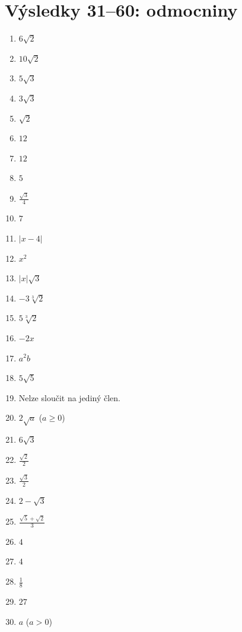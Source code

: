\documentclass[11pt,a4paper]{article}
\begin{document}
\section*{Výsledky 31--60: odmocniny}
\begin{enumerate}[label=\textbf{\arabic*.},leftmargin=9mm,itemsep=4pt,start=31]
\small
\item $6\sqrt2$
\item $10\sqrt2$
\item $5\sqrt3$
\item $3\sqrt3$
\item $\sqrt2$
\item $12$
\item $12$
\item $5$
\item $\tfrac{\sqrt3}4$
\item $7$
\item $|x-4|$
\item $x^2$
\item $|x|\sqrt3$
\item $-3\sqrt[3]2$
\item $5\sqrt[3]2$
\item $-2x$
\item $a^2b$
\item $5\sqrt5$
\item Nelze sloučit na jediný člen.
\item $2\sqrt a$ ($a\ge0$)
\item $6\sqrt3$
\item $\tfrac{\sqrt2}2$
\item $\tfrac{\sqrt3}2$
\item $2-\sqrt3$
\item $\tfrac{\sqrt5+\sqrt2}3$
\item $4$
\item $4$
\item $\tfrac18$
\item $27$
\item $a$ ($a>0$)
\end{enumerate}
\end{document}
